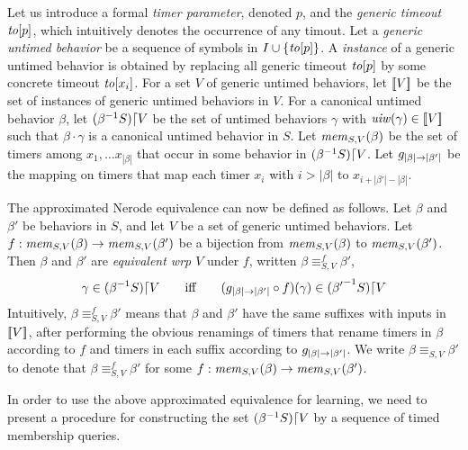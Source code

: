 Let us introduce a formal {\em timer parameter}, denoted $p$, and the
{\em generic timeout} $\toevent{p}$,
which intuitively denotes the occurrence of any timout.
Let a {\em generic untimed behavior} be a sequence of symbols in
$I \cup \set{\toevent{p}}$.
A {\em instance} of a generic untimed behavior is obtained by replacing all
generic timeout $\toevent{p}$ by some concrete timeout $\toevent{x_i}$.
For a set $V$ of generic untimed behaviors, let $\instancesof{V}$ be the
set of instances of generic untimed behaviors in $V$. For a canonical untimed
behavior $\beta$, let $\suffixbehs{S}{\beta}{V}$ be the set of untimed behaviors
$\gamma$ with $\untimedinputword(\gamma) \in \instancesof{V}$ such that
$\beta\cdot\gamma$ is a canonical untimed behavior in $S$. Let
$\getmemorable{S}{\beta}{V}$ be the set of timers among
$x_1 , \ldots x_{|\beta|}$ that occur in some behavior in
$\suffixbehs{S}{\beta}{V}$.
Let $\suffbij{\beta}{\beta'}$ be the mapping on timers that map each
timer $x_i$ with $i > |\beta|$ to $x_{i + |\beta'| - |\beta|}$.


The approximated Nerode equivalence can now be defined as follows.
Let $\beta$ and $\beta'$ be behaviors in $S$, and let  $V$ be a set of
generic untimed behaviors.
Let $f : \getmemorable{S}{\beta}{V} \to \getmemorable{S}{\beta'}{V}$
be a bijection
from $\getmemorable{S}{\beta}{V}$ to $\getmemorable{S}{\beta'}{V}$.
Then $\beta$ and $\beta'$ are \emph{equivalent wrp $V$} under $f$, written
$\beta \equiv_{S,V}^f \beta'$, 
\[
\gamma \in \suffixbehs{S}{\beta}{V}
\qquad \mbox{iff} \qquad
(\suffbij{\beta}{\beta'} \circ f) (\gamma) \in \suffixbehs{S}{\beta'}{V}
\]
Intuitively, $\beta \equiv_{S,V}^f \beta'$ means that $\beta$ and $\beta'$
have the same suffixes with inputs in $\instancesof{V}$, after performing the
obvious renamings of timers that rename timers in $\beta$ according to
$f$ and timers in each suffix according to $\suffbij{\beta}{\beta'}$.
We write $\beta \equiv_{S,V} \beta'$ to denote that
$\beta \equiv_{S,V}^f \beta'$ for some
$f : \getmemorable{S}{\beta}{V} \to \getmemorable{S}{\beta'}{V}$.


In order to use the above approximated equivalence for learning, we need to
present a procedure for constructing the set
$\suffixbehs{S}{\beta}{V}$ by a sequence of timed membership queries.

